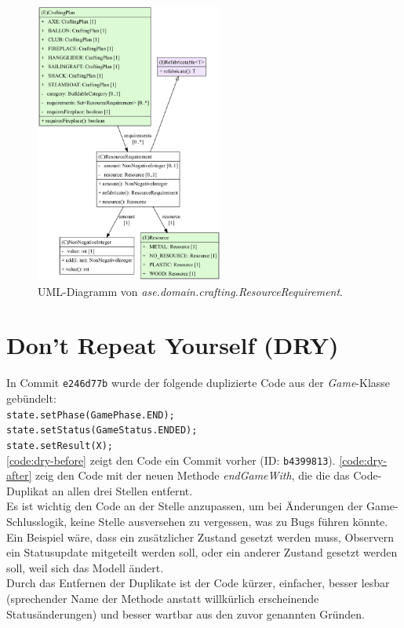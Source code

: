 \begin{figure}[H]
	\centering
	\includegraphics[width=0.55\textwidth]{Bilder/ResourceRequirement_structure.pdf} 
	\caption{UML-Diagramm von \textit{ase.domain.crafting.ResourceRequirement}.}
	\label{fig:cohesion-ResourceRequirement}
\end{figure} 


\section{Don't Repeat Yourself (DRY)}

In Commit \texttt{e246d77b} wurde der folgende duplizierte Code aus der \textit{Game}-Klasse gebündelt: \\
\texttt{state.setPhase(GamePhase.END);} \\
\texttt{state.setStatus(GameStatus.ENDED);} \\
\texttt{state.setResult(X);} \\
\autoref{code:dry-before} zeigt den Code ein Commit vorher (ID: \texttt{b4399813}).
\autoref{code:dry-after} zeig den Code mit der neuen Methode \textit{endGameWith}, die die das Code-Duplikat 
an allen drei Stellen entfernt. \\
Es ist wichtig den Code an der Stelle anzupassen, um bei Änderungen der Game-Schlusslogik, keine 
Stelle ausversehen zu vergessen, was zu Bugs führen könnte. Ein Beispiel wäre, dass ein zusätzlicher Zustand 
gesetzt werden muss, Observern ein Statusupdate mitgeteilt werden soll, oder ein anderer Zustand gesetzt 
werden soll, weil sich das Modell ändert. \\
Durch das Entfernen der Duplikate ist der Code kürzer, einfacher, besser lesbar (sprechender Name der Methode anstatt 
willkürlich erscheinende Statusänderungen) und besser wartbar aus den zuvor genannten Gründen.   


